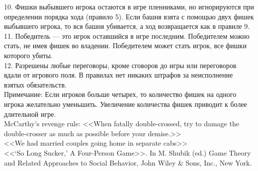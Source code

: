 \begin{problem} 
10. Фишки выбывшего игрока остаются в игре пленниками, но игнорируются при определении порядка хода (правило 5). Если башня взята с помощью двух фишек выбывшего игрока, то вся башня убивается, а ход возвращается как в правиле 9.\\
11. Победитель --- это игрок оставшийся в игре последним. Победителем можно стать, не имея фишек во владении. Победителем может стать игрок, все фишки которого убиты.\\
12. Разрешены любые переговоры, кроме сговоров до игры или переговоров вдали от игрового поля. В правилах нет никаких штрафов за неисполнение взятых обязательств.\\
Примечание: Если игроков больше четырех, то количество фишек на одного игрока желательно уменьшить. Увеличение количества фишек приводит к более длительной игре.\\
McCarthy's revenge rule: <<When fatally double-crossed, try to damage the double-crosser as much as possible before your demise.>>\\
<<We had married couples going home in separate cabs>>\\
<<`So Long Sucker,' A Four-Person Game>>. In M. Shubik (ed.) Game Theory and Related Approaches to Social Behavior, John Wiley \& Sons, Inc., New York.



\begin{sol}

\end{sol}
\end{problem}






